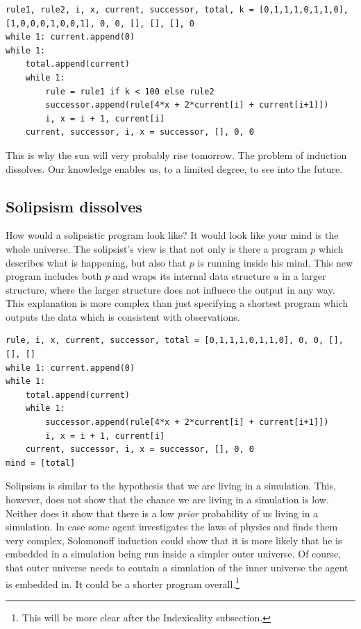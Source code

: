 \begin{lstlisting}[caption={A short program using one rule for the first 100 time steps, another rule from then on. This program is longer than just using the same rule all the time.}]
rule1, rule2, i, x, current, successor, total, k = [0,1,1,1,0,1,1,0], [1,0,0,0,1,0,0,1], 0, 0, [], [], [], 0
while 1: current.append(0)
while 1:
	total.append(current)
	while 1:
		rule = rule1 if k < 100 else rule2
		successor.append(rule[4*x + 2*current[i] + current[i+1]])
		i, x = i + 1, current[i]
	current, successor, i, x = successor, [], 0, 0
\end{lstlisting}

This is why the sun will very probably rise tomorrow.
The problem of induction dissolves.
Our knowledge enables us, to a limited degree, to see into the future.

\newpage

\subsection{Solipsism dissolves}

How would a solipsistic program look like?
It would look like your mind is the whole universe.
The solipsist's view is that not only is there a program $p$ which describes what is happening, but also that $p$ is running inside his mind.
This new program includes both $p$ and wraps its internal data structure $u$ in a larger structure, where the larger structure does not influece the output in any way.
This explanation is more complex than just specifying a shortest program which outputs the data which is consistent with observations. 

\begin{lstlisting}[caption={A solipsistic program.}]
rule, i, x, current, successor, total = [0,1,1,1,0,1,1,0], 0, 0, [], [], []
while 1: current.append(0)
while 1:
	total.append(current)
	while 1:
		successor.append(rule[4*x + 2*current[i] + current[i+1]])
		i, x = i + 1, current[i]
	current, successor, i, x = successor, [], 0, 0
mind = [total]
\end{lstlisting}

Solipsism is similar to the hypothesis that we are living in a simulation.
This, however, does not show that the chance we are living in a simulation is low.
Neither does it show that there is a low \textit{prior} probability of us living in a simulation.
In case some agent investigates the laws of physics and finds them very complex, Solomonoff induction could show that it is more likely that he is embedded in a simulation being run inside a simpler outer universe.
Of course, that outer universe needs to contain a simulation of the inner universe the agent is embedded in.
It could be a shorter program overall.\footnote{This will be more clear after the Indexicality subsection.}

